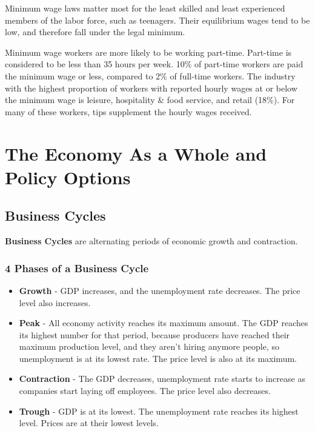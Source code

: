 \documentclass{article}
\begin{document}
Minimum wage laws matter most for the least skilled and least experienced members of the labor force, such as teenagers. Their equilibrium wages tend to be low, and therefore fall under the legal minimum.

Minimum wage workers are more likely to be working part-time. Part-time is considered to be less than 35 hours per week. 10\% of part-time workers are paid the minimum wage or less, compared to 2\% of full-time workers. The industry with the highest proportion of workers with reported hourly wages at or below the minimum wage is leisure, hospitality \& food service, and retail (18\%). For many of these workers, tips supplement the hourly wages received.

\section{The Economy As a Whole and Policy Options}

\subsection{Business Cycles}
\textbf{Business Cycles} are alternating periods of economic growth and contraction.

\subsubsection{4 Phases of a Business Cycle}
\begin{itemize}
    \item{\textbf{Growth} - GDP increases, and the unemployment rate decreases. The price level also increases.}
    \item{\textbf{Peak} - All economy activity reaches its maximum amount. The GDP reaches its highest number for that period, because producers have reached their maximum production level, and they aren't hiring anymore people, so unemployment is at its lowest rate. The price level is also at its maximum.}
    \item{\textbf{Contraction} - The GDP decreases, unemployment rate starts to increase as companies start laying off employees. The price level also decreases.}
    \item{\textbf{Trough} - GDP is at its lowest. The unemployment rate reaches its highest level. Prices are at their lowest levels.}
\end{itemize}
\end{document}
